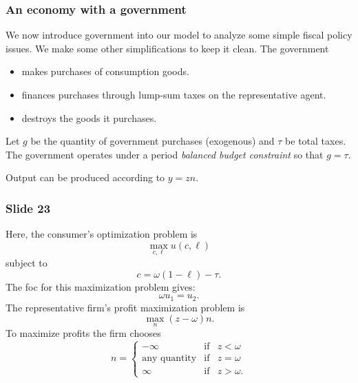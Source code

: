\documentclass[aspectratio=169]{ltx-talk}
\begin{document}
\begin{frame}
\frametitle{An economy with a government}
We now introduce government into our model to analyze some simple fiscal
policy issues. We make some other simplifications to keep it clean. The
government

\begin{itemize}
\item makes purchases of consumption goods.

\item finances purchases through lump-sum taxes on the representative agent.

\item destroys the goods it purchases.
\end{itemize}

Let $g$ be the quantity of government purchases (exogenous) and $\tau $ be
total taxes. The government operates under a period \textit{balanced budget
constraint} so that $g=\tau .$

Output can be produced according to $y=zn$.
\end{frame}

\begin{frame}
\frametitle{Slide 23}
Here, the consumer's optimization problem is%
\begin{equation*}
\underset{c,\ell }{\max }u\left( c,\ell \right)
\end{equation*}%
subject to%
\begin{equation*}
c=\omega (1-\ell )-\tau .
\end{equation*}%
The foc for this maximization problem gives:%
\begin{equation*}
\omega u_{1}=u_{2}.
\end{equation*}%
The representative firm's profit maximization problem is%
\begin{equation*}
\underset{n}{\max }\left( z-\omega \right) n.
\end{equation*}%
To maximize profits the firm chooses 
\begin{equation*}
n=\left\{ 
\begin{array}{ccc}
-\infty & \text{if} & z<\omega \\ 
\text{any quantity} & \text{if} & z=\omega \\ 
\infty & \text{if} & z>\omega .%
\end{array}%
\right.
\end{equation*}%
\end{frame}
\end{document}
